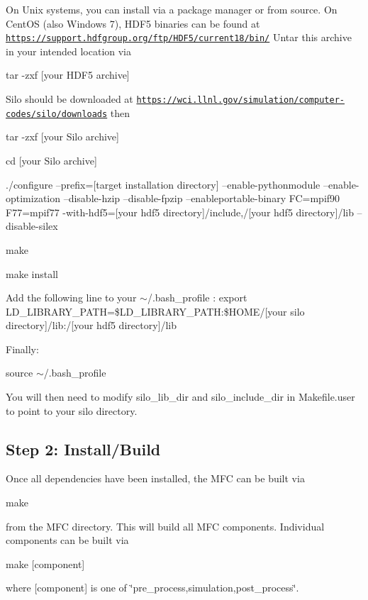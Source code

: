 On Unix systems, you can install via a package manager or from source. On Cent\+OS (also Windows 7), H\+D\+F5 binaries can be found at \href{https://support.hdfgroup.org/ftp/HDF5/current18/bin/}{\tt https\+://support.\+hdfgroup.\+org/ftp/\+H\+D\+F5/current18/bin/} Untar this archive in your intended location via \begin{DoxyItemize}
\item tar -\/zxf \mbox{[}your H\+D\+F5 archive\mbox{]}\end{DoxyItemize}
Silo should be downloaded at \href{https://wci.llnl.gov/simulation/computer-codes/silo/downloads}{\tt https\+://wci.\+llnl.\+gov/simulation/computer-\/codes/silo/downloads} then \begin{DoxyItemize}
\item tar -\/zxf \mbox{[}your Silo archive\mbox{]} \item cd \mbox{[}your Silo archive\mbox{]} \item ./configure --prefix=\mbox{[}target installation directory\mbox{]} --enable-\/pythonmodule --enable-\/optimization --disable-\/hzip --disable-\/fpzip --enableportable-\/binary FC=mpif90 F77=mpif77 -\/with-\/hdf5=\mbox{[}your hdf5 directory\mbox{]}/include,/\mbox{[}your hdf5 directory\mbox{]}/lib --disable-\/silex \item make \item make install\end{DoxyItemize}
Add the following line to your $\sim$/.bash\+\_\+profile \+: export L\+D\+\_\+\+L\+I\+B\+R\+A\+R\+Y\+\_\+\+P\+A\+TH=\$\+L\+D\+\_\+\+L\+I\+B\+R\+A\+R\+Y\+\_\+\+P\+A\+TH\+:\$\+H\+O\+ME/\mbox{[}your silo directory\mbox{]}/lib\+:/\mbox{[}your hdf5 directory\mbox{]}/lib

Finally\+: \begin{DoxyItemize}
\item source $\sim$/.bash\+\_\+profile\end{DoxyItemize}
You will then need to modify silo\+\_\+lib\+\_\+dir and silo\+\_\+include\+\_\+dir in Makefile.\+user to point to your silo directory.\hypertarget{index_step2}{}\subsection{Step 2\+: Install/\+Build}\label{index_step2}
Once all dependencies have been installed, the M\+FC can be built via \begin{DoxyItemize}
\item make\end{DoxyItemize}
from the M\+FC directory. This will build all M\+FC components. Individual components can be built via \begin{DoxyItemize}
\item make \mbox{[}component\mbox{]}\end{DoxyItemize}
where \mbox{[}component\mbox{]} is one of \char`\"{}pre\+\_\+process,simulation,post\+\_\+process\char`\"{}.

